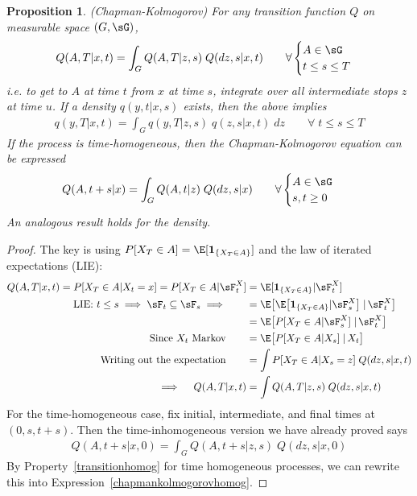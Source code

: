 \documentclass[12pt]{article}
\theoremstyle{plain}
\newtheorem{prop}[thm]{Proposition}
\theoremstyle{definition}
\theoremstyle{remark}
\begin{document}
\begin{prop}\emph{(Chapman-Kolmogorov)}
For any transition function $Q$ on measurable space $(G,\sG)$,
\begin{align*}
  Q(A,T|x,t)
  =
  \int_{G}
  Q(A,T|z,s)
  \;
  Q(dz,s|x,t)
  \qquad
  \forall
  \begin{cases}
    A\in\sG \\
    t\leq s\leq T
  \end{cases}
\end{align*}
i.e. to get to $A$ at time $t$ from $x$ at time $s$, integrate over
all intermediate stops $z$ at time $u$.
If a density $q(y,t|x,s)$ exists, then the above implies
\begin{align*}
  q(y,T|x,t)
  =
  \int_{G}
  q(y,T|z,s)
  \;
  q(z,s|x,t)
  \;dz
  \qquad
  \forall\;
  t\leq s\leq T
\end{align*}
If the process is time-homogeneous, then the Chapman-Kolmogorov equation
can be expressed
\begin{align}
  Q(A,t+s|x)
  &=
  \int_{G}
  Q(A,t|z)
  \;
  Q(dz,s|x)
  \qquad
  \forall
  \begin{cases}
    A\in\sG \\
    s,t\geq 0
  \end{cases}
  \label{chapmankolmogorovhomog}
\end{align}
An analogous result holds for the density.
\end{prop}
\begin{proof}
The key is using $P[X_T\in A]=\E[\mathbf{1}_{\{X_T\in A\}}]$ and the law
of iterated expectations (LIE):
\begin{align*}
  Q(A,T|x,t)
  =
  P[X_T\in A|X_t=x]
  =
  P[X_T\in A|\sF_t^X]
  &=
  \E[\mathbf{1}_{\{X_T\in A\}}|\sF_t^X]
  \\
  \text{LIE: $t\leq s\implies\sF_t\subseteq\sF_s\implies$}
  \qquad
  &=
  \E\big[
    \E\big[
    \mathbf{1}_{\{X_T\in A\}}|\sF_s^X
    \big]
    \;|\,\sF_t^X
  \big]
  \\
  &=
  \E\big[
    P[X_T\in A|\sF_s^X]
    \;|\,\sF_t^X
  \big]
  \\
  \text{Since $X_t$ Markov}
  \qquad
  &=
  \E\big[
    P[X_T\in A|X_s]
    \;|\,X_t
  \big]
  \\
  \text{Writing out the expectation}
  \qquad
  &=
  \int
  P[X_T\in A|X_s=z]
  \;Q(dz,s|x,t)
  \\
  \implies\quad
  Q(A,T|x,t)
  &=
  \int
  Q(A,T|z,s)
  \;Q(dz,s|x,t)
\end{align*}
For the time-homogeneous case, fix initial, intermediate, and
final times at $(0,s,t+s)$. Then the time-inhomogeneous version we have
already proved says
\begin{align*}
  Q(A,t+s|x,0)
  =
  \int_{G}
  Q(A,t+s|z,s)
  \;
  Q(dz,s|x,0)
\end{align*}
By Property~\ref{transitionhomog} for time homogeneous processes, we can
rewrite this into Expression~\ref{chapmankolmogorovhomog}.
\end{proof}
\end{document}
